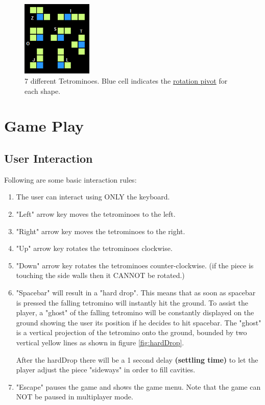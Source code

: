 \documentclass[10pt]{report}
\theoremstyle{definition}
\theoremstyle{remark}
\begin{document}
\begin{figure}
\label{fig:tetrominoes}
  \centering
    \includegraphics[width=0.3\textwidth]{tetrominoes}
    \caption[Types of tetromino]{7 different Tetrominoes. Blue cell indicates the \underline{rotation pivot} for each shape.}
\end{figure}

\chapter{Game Play}
\section{User Interaction}
\label{sec:userInteraction}
Following are some basic interaction rules:
\begin{enumerate}
\item The user can interact using ONLY the keyboard.
\item "Left" arrow key moves the tetrominoes to the left.
\item "Right" arrow key moves the tetrominoes to the right.
\item "Up" arrow key rotates the tetrominoes clockwise.
\item "Down" arrow key rotates the tetrominoes counter-clockwise. (if the piece is touching the side walls then it CANNOT be rotated.)
\item "Spacebar" will result in a "hard drop". This means that as soon as spacebar is pressed the falling tetromino will instantly hit the ground. To assist the player, a "ghost" of the falling tetromino will be constantly displayed on the ground showing the user its position if he decides to hit spacebar. The "ghost" is a vertical projection of the tetromino onto the ground, bounded by two vertical yellow lines as shown in figure \ref{fig:hardDrop}.

    After the hardDrop there will be a 1 second delay \textbf{(settling time)} to let the player adjust the piece "sideways" in order to fill cavities.
\item "Escape" pauses the game and shows the game menu. Note that the game can NOT be paused in multiplayer mode.

\end{enumerate}
\end{document}
